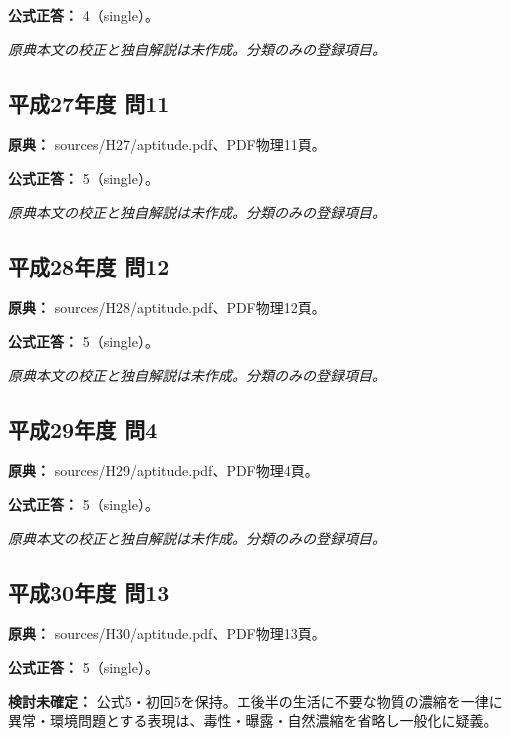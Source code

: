 \textbf{公式正答：} 4（single）。

\par\textit{原典本文の校正と独自解説は未作成。分類のみの登録項目。}

\subsection{平成27年度 問11}
\label{q:h27-reg-apt-11}

\noindent\textbf{原典：} sources/H27/aptitude.pdf、PDF物理11頁。

\textbf{公式正答：} 5（single）。

\par\textit{原典本文の校正と独自解説は未作成。分類のみの登録項目。}

\subsection{平成28年度 問12}
\label{q:h28-reg-apt-12}

\noindent\textbf{原典：} sources/H28/aptitude.pdf、PDF物理12頁。

\textbf{公式正答：} 5（single）。

\par\textit{原典本文の校正と独自解説は未作成。分類のみの登録項目。}

\subsection{平成29年度 問4}
\label{q:h29-reg-apt-04}

\noindent\textbf{原典：} sources/H29/aptitude.pdf、PDF物理4頁。

\textbf{公式正答：} 5（single）。

\par\textit{原典本文の校正と独自解説は未作成。分類のみの登録項目。}

\subsection{平成30年度 問13}
\label{q:h30-reg-apt-13}

\noindent\textbf{原典：} sources/H30/aptitude.pdf、PDF物理13頁。

\textbf{公式正答：} 5（single）。

\par\textbf{検討未確定：} 公式5・初回5を保持。エ後半の生活に不要な物質の濃縮を一律に異常・環境問題とする表現は、毒性・曝露・自然濃縮を省略し一般化に疑義。

